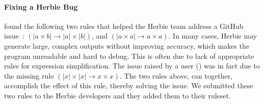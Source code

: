 
\paragraph{Fixing a Herbie Bug}

 found the following two rules that
 helped the Herbie team address a GitHub issue~\cite{herbie-bug}:
$(|a \times b| \to |a| \times |b|)$, and
$(|a \times a| \to a \times a)$.
In many cases, Herbie may generate large,
 complex outputs without improving accuracy, which makes
 the program unreadable and hard to debug.
This is often due to lack of appropriate rules for
  expression simplification.
The issue raised by a user (\cite{herbie-bug}) was in fact due to the
 missing rule $(|x| \times |x| \to x \times x)$.
The two rules above, can together, accomplish the effect of this
 rule, thereby solving the issue.
We submitted these two rules to the Herbie developers and they
 added them to their ruleset.
